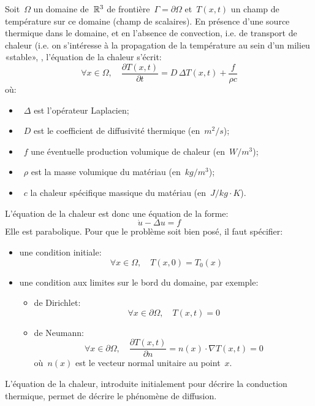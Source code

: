 \medskip
Soit~$\Omega$ un domaine de~$\mathbb R^3$ de frontière~$\Gamma=\partial \Omega$ et~$T(x,t)$ un champ de température sur ce domaine (champ de scalaires). 
En présence d'une source thermique dans le domaine, et en l'absence de convection, i.e. de transport de chaleur (i.e. on s'intéresse à la propagation de la température au sein d'un milieu «stable», , l'équation de la chaleur s'écrit:
\begin{equation}
\forall x \in\Omega, \quad \frac{\partial T (x,t)}{\partial t} = D \, \Delta T(x,t) + \frac{f}{\rho c}
\end{equation}
où:
\begin{itemize}
  \item~$\Delta$ est l'opérateur Laplacien;
  \item~$D$ est le coefficient de diffusivité thermique (en~$m^2/s$);
  \item~$f$ une éventuelle production volumique de chaleur (en~$W/m^3$);
  \item~$\rho$ est la masse volumique du matériau (en~$kg/m^3$);
  \item~$c$ la chaleur spécifique massique du matériau (en~$J/kg·K$).
\end{itemize}
\medskipvm{}
L'équation de la chaleur est donc une équation de la forme:
\begin{equation}
\dot{u}-\Delta u=f
\end{equation}
Elle est parabolique.
\medskipvm
Pour que le problème soit bien posé, il faut spécifier:
\begin{itemize}
  \item une condition initiale:
  \begin{equation}\forall x\in\Omega, \quad T (x,0) = T_0(x)\end{equation}
  \item une condition aux limites sur le bord du domaine, par exemple:
  \begin{itemize}
  \item de Dirichlet:\begin{equation}\forall x\in\partial \Omega, \quad T (x,t) = 0\end{equation}
  \item de Neumann:\begin{equation}\forall x\in\partial \Omega, \quad \frac{\partial T (x,t)}{\partial n} = n(x) \cdot \nabla T(x,t) = 0\end{equation} où~$n(x)$ est le vecteur normal unitaire au point~$x$.
	\end{itemize}
\end{itemize}
\medskipvm
L'équation de la chaleur, introduite initialement pour décrire la conduction thermique, permet de décrire le phénomène de diffusion.

